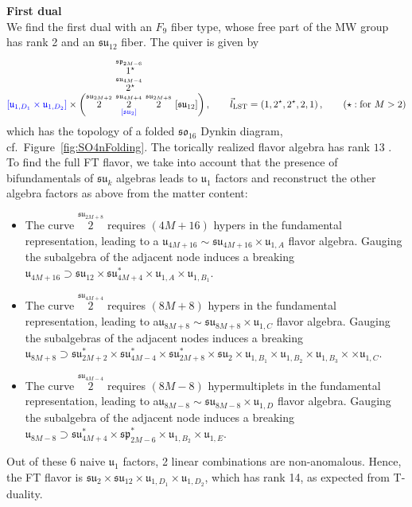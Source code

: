 \documentclass[11pt]{article}
\numberwithin{equation}{section}
\newcommand\myoverset[2]{\overset{\textstyle #1\mathstrut}{#2}}
\newcommand{\fu}{\mathfrak{u}}
\newcommand{\fsu}{\mathfrak{su}}
\newcommand{\LST}{\text{LST}\xspace}
\begin{document}
\textbf{First dual}\\
We find the first dual with an $F_{9}$ fiber type, whose free part of the MW group has rank 2 and an $\fsu_{12}$ fiber. The quiver is given by
\begin{align}
\label{exflav1dual}
\textcolor{blue}{\lbrack  \mathfrak{u}_{1,D_{1}} \times  \mathfrak{u}_{1,D_{2}} \rbrack } \times \bigg(
{\overset{\mathfrak{su}_{2M+2}}{2}}  \, \,   
\myoverset{\myoverset{\overset{\mathfrak{sp}_{2M-6}}{~1^{\star}}}{\overset{\mathfrak{su}_{4M-4}}{~2^{\star}}}}
{\underset{\textcolor{blue}{\left[\mathfrak{su}_{2}\right]}}{\overset{\mathfrak{su}_{4M+4}}{2}}} \, \,     
{\overset{\mathfrak{su}_{2M+8}}{2}} \, \,  
\lbrack \mathfrak{su}_{12} \rbrack \bigg)  \, ,   \qquad \vec{l}_{\LST}=(1, 2^\star,2^\star,2, 1) \, , \qquad (\star : \text{for } M>2)
\end{align}
which has the topology of a folded $\mathfrak{so}_{16}$ Dynkin diagram, cf.\ Figure~\ref{fig:SO4nFolding}. The torically realized flavor algebra has rank $13$ . To find the full FT flavor, we take into account that the presence of bifundamentals of $\mathfrak{su}_k$ algebras leads to $\fu_1$ factors and reconstruct the other algebra factors as above from the matter content:
\begin{itemize}
    \item The curve ${\overset{\mathfrak{su}_{2M+8}}{2}}$ requires $(4M+16)$ hypers in the fundamental representation, leading to a $\mathfrak{u}_{4M+16}\sim\mathfrak{su}_{4M+16} \times \mathfrak{u}_{1,A}$ flavor algebra. Gauging the subalgebra of the adjacent node induces a breaking $\mathfrak{u}_{4M+16}\supset\mathfrak{su}_{12} \times \mathfrak{su}_{4M+4}^{*} \times\mathfrak{u}_{1,{A}} \times \mathfrak{u}_{1,B_1}$.
    \item  The curve ${\overset{\mathfrak{su}_{4M+4}}{2}}$ requires $(8M+8)$ hypers in the fundamental representation, leading to a\linebreak $\mathfrak{u}_{8M+8}\sim\mathfrak{su}_{8M+8} \times \mathfrak{u}_{1,C}$ flavor algebra. Gauging the subalgebras of the adjacent nodes induces a breaking $\mathfrak{u}_{8M+8}\supset \mathfrak{su}_{2M+2}^{*} \times \mathfrak{su}_{4M-4}^{*} \times \mathfrak{su}_{2M+8}^{*} \times \mathfrak{su}_{2} \times \mathfrak{u}_{1,B_1} \times \mathfrak{u}_{1,B_2} \times\mathfrak{u}_{1,B_3} \times \times \mathfrak{u}_{1,C}$.
     \item The curve ${\overset{\mathfrak{su}_{4M-4}}{2}}$ requires $(8M-8)$ hypermultiplets in the fundamental representation, leading to a\linebreak  $\mathfrak{u}_{8M-8}\sim\mathfrak{su}_{8M-8} \times \mathfrak{u}_{1,D}$ flavor algebra. Gauging the subalgebra of the adjacent node induces a breaking $\mathfrak{u}_{8M-8}\supset\mathfrak{su}_{4M+4}^{*} \times \mathfrak{sp}_{2M-6}^{*} \times \mathfrak{u}_{1,B_{2}} \times\mathfrak{u}_{1,E}$.
\end{itemize}
Out of these 6 naive $\fu_1$ factors, 2 linear combinations are non-anomalous. Hence, the FT flavor is $\mathfrak{su}_{2} \times \mathfrak{su}_{12} \times \mathfrak{u}_{1,D_{1}} \times \mathfrak{u}_{1,D_{2}}$, which has rank 14, as expected from T-duality.
\end{document}
